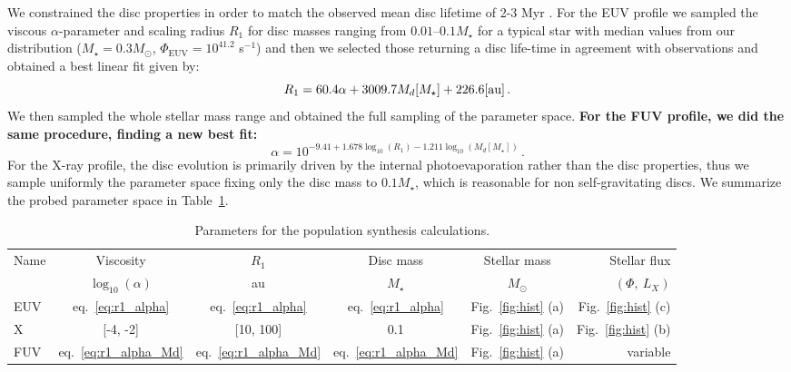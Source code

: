 \documentclass[fleqn,usenatbib]{mnras}
\begin{document}
We constrained the disc properties in order to match the observed mean disc lifetime of 2-3 Myr \citep[see e.g.][]{Ribas2014}. For the EUV profile we sampled the viscous $\alpha$-parameter and scaling radius $R_1$ for disc masses ranging from $0.01$--$0.1 M_\star$ for a typical star with median values from our distribution ($M_\star = 0.3 M_\odot$, $\Phi_\mathrm{EUV} = 10^{41.2}$ s$^{-1}$) and then we selected those returning a disc life-time in agreement with observations and obtained a best linear fit given by:
\begin{equation}\label{eq:r1_alpha}
    R_1 = 60.4 \alpha + 3009.7 M_d [M_\star] + 226.6 \\\text{[au]} \,.
\end{equation}
We then sampled the whole stellar mass range and obtained the full sampling of the parameter space.
\textbf{For the FUV profile, we did the same procedure, finding a new best fit:
\begin{equation}\label{eq:r1_alpha_Md}
    \alpha = 10^{-9.41+1.678\log_{10}(R_1)-1.211\log_{10}(M_d [M_\star])}\,.
\end{equation}}
For the X-ray profile, the disc evolution is primarily driven by the internal photoevaporation rather than the disc properties, thus we sample uniformly the parameter space fixing only the disc mass to $0.1 M_\star$, which is reasonable for non self-gravitating discs. We summarize the probed parameter space in Table~\ref{tab:popsynthtable}.
\begin{table}
	\centering
	\caption{Parameters for the population synthesis calculations.}
	\label{tab:popsynthtable}
	\begin{tabular}{lccccr}
        \hline
		\hline
		  Name & Viscosity & $R_1$ & Disc mass & Stellar mass & Stellar flux \\
        & $\log_{10}(\alpha)$ & au & $M_\star$ & $M_\odot$ & $(\Phi,\ L_X)$\\
		\hline
		  EUV & eq.~\ref{eq:r1_alpha} & eq.~\ref{eq:r1_alpha} & eq.~\ref{eq:r1_alpha} & Fig.~\ref{fig:hist} (a) & Fig.~\ref{fig:hist} (c)\\
		X & [-4, -2] & [10, 100] & 0.1 & Fig.~\ref{fig:hist} (a) & Fig.~\ref{fig:hist} (b)\\
        FUV & eq.~\ref{eq:r1_alpha_Md} & eq.~\ref{eq:r1_alpha_Md} & eq.~\ref{eq:r1_alpha_Md} & Fig.~\ref{fig:hist} (a) & variable\\
		\hline
	\end{tabular}
\end{table}
\end{document}
